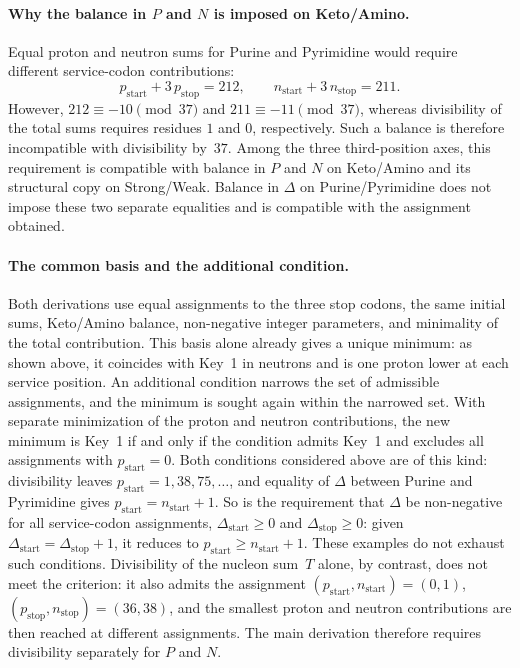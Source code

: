 \documentclass[11pt,a4paper]{article}
\renewcommand{\_}{\origunderscore\allowbreak}
\begin{document}
\paragraph{Why the balance in $P$ and $N$ is imposed on Keto/Amino.}
Equal proton and neutron sums for Purine and Pyrimidine
would require different service-codon contributions:
\[
p_{\text{start}}+3\,p_{\text{stop}}=212,
\qquad n_{\text{start}}+3\,n_{\text{stop}}=211.
\]
However, $212\equiv-10\pmod{37}$ and
$211\equiv-11\pmod{37}$, whereas divisibility of the
total sums requires residues $1$ and $0$, respectively.
Such a balance is therefore incompatible with divisibility
by~$37$. Among the three third-position axes, this requirement
is compatible with balance in $P$ and $N$ on Keto/Amino
and its structural copy on Strong/Weak. Balance in $\Delta$
on Purine/Pyrimidine does not impose these two separate
equalities and is compatible with the assignment obtained.

\paragraph{The common basis and the additional condition.}
Both derivations use equal assignments to the three stop
codons, the same initial sums, Keto/Amino balance,
non-negative integer parameters, and minimality of the total
contribution. This basis alone already gives a unique minimum:
as shown above, it coincides with Key~1 in neutrons and is one
proton lower at each service position. An additional condition
narrows the set of admissible assignments, and the minimum is
sought again within the narrowed set. With separate minimization
of the proton and neutron contributions, the new minimum is
Key~1 if and only if the condition admits Key~1 and excludes
all assignments with $p_{\text{start}}=0$. Both conditions
considered above are of this kind: divisibility leaves
$p_{\text{start}}=1,38,75,\ldots$, and equality of $\Delta$
between Purine and Pyrimidine gives
$p_{\text{start}}=n_{\text{start}}+1$. So is the requirement
that $\Delta$ be non-negative for all service-codon assignments,
$\Delta_{\text{start}}\ge0$ and $\Delta_{\text{stop}}\ge0$:
given $\Delta_{\text{start}}=\Delta_{\text{stop}}+1$, it
reduces to $p_{\text{start}}\ge n_{\text{start}}+1$. These
examples do not exhaust such conditions. Divisibility of the
nucleon sum~$T$ alone, by contrast, does not meet the criterion:
it also admits the assignment
$(p_{\text{start}},n_{\text{start}})=(0,1)$,
$(p_{\text{stop}},n_{\text{stop}})=(36,38)$, and the smallest
proton and neutron contributions are then reached at different
assignments. The main derivation therefore requires divisibility
separately for $P$ and $N$.
\end{document}
